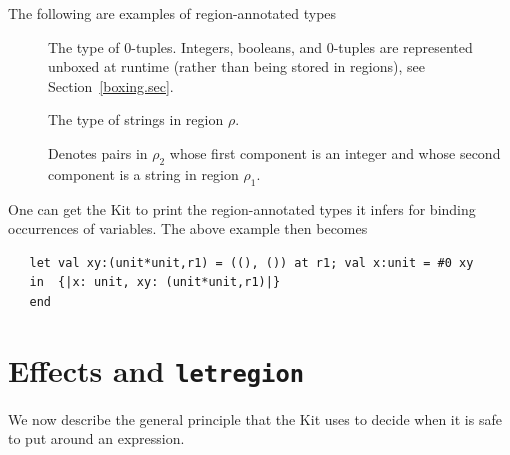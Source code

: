 \documentclass[12pt]{book}
\begin{document}
The following are examples of region-annotated types
\begin{description}
\item[] The type of 0-tuples.   Integers, booleans, and 0-tuples are represented unboxed
  at runtime (rather than being stored in regions), 
  see Section~\ref{boxing.sec}.
\item[] The type of strings in region
  $\rho$.
\item[] Denotes
  pairs in $\rho_2$ whose first component is an integer and whose second
  component is a string in region $\rho_1$. 
\end{description}


One can get the Kit to print the region-annotated types it infers
for binding occurrences of variables. 
The above example then becomes
\begin{verbatim}
   let val xy:(unit*unit,r1) = ((), ()) at r1; val x:unit = #0 xy
   in  {|x: unit, xy: (unit*unit,r1)|}
   end 
\end{verbatim}

\section{Effects and {\tt letregion}}
\label{effects.sec}
We now describe the general principle that the Kit uses to decide
when it is safe to put  around  an expression.
\end{document}
